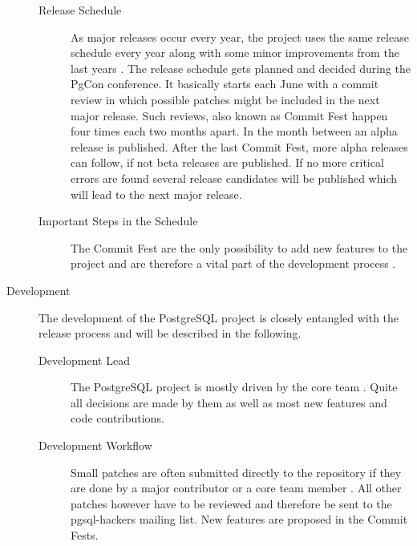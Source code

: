 \begin{description}
\begin{description}
    \item[Release Schedule] As major releases occur every year, the project
      uses the same release schedule every year along with some minor
      improvements from the last years \cite{PostgreSQLDevelopment}. The
      release schedule gets planned and decided during the PgCon conference. It
      basically starts each June with a commit review in which possible patches
      might be included in the next major release. Such reviews, also known as
      Commit Fest happen four times each two months apart. In the month between
      an alpha release is published. After the last Commit Fest, more alpha
      releases can follow, if not beta releases are published. If no more
      critical errors are found several release candidates will be published
      which will lead to the next major release.

    \item[Important Steps in the Schedule] The Commit Fest are the only
      possibility to add new features to the project and are therefore a vital
      part of the development process
      \cite{PostgreSQLDevelopment,PostgreSQLCommitFest}. 

  \end{description}

  \item[Development] The development of the PostgreSQL project is closely
    entangled with the release process and will be described in the following.

  \begin{description}

    \item[Development Lead] The PostgreSQL project is mostly driven by the core
      team \cite{PostgreSQLDevFAQ,PostgreSQLFAQ,PostgreSQLContributors}. Quite
      all decisions are made by them as well as most new features and code
      contributions.

    \item[Development Workflow] Small patches are often submitted directly to
      the repository if they are done by a major contributor or a core team
      member \cite{PostgreSQLDevFAQ}. All other patches however have to be
      reviewed and therefore be sent to the pgsql-hackers mailing list. New
      features are proposed in the Commit Fests.


\end{description}
\end{description}
